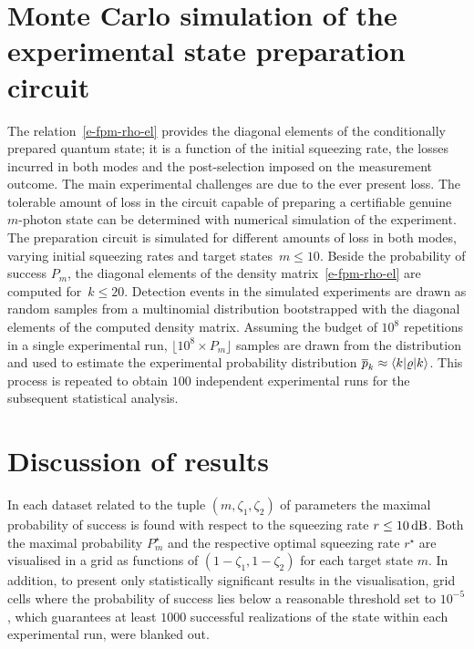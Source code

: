 \documentclass{article}
\begin{document}
%
%

\section{Monte Carlo simulation of the experimental state preparation circuit}

The relation~\eqref{e-fpm-rho-el} provides the diagonal elements of the conditionally prepared quantum state; it is a function of the initial squeezing rate, the losses incurred in both modes and the post-selection imposed on the measurement outcome. The main experimental challenges are due to the ever present loss. The tolerable amount of loss in the circuit capable of preparing a certifiable genuine $m$-photon state can be determined with numerical simulation of the experiment. The preparation circuit is simulated for different amounts of loss in both modes, varying initial squeezing rates and target states~${m \leq 10}$. Beside the probability of success $P_{m}$, the diagonal elements of the density matrix~\eqref{e-fpm-rho-el} are computed for~${k \leq 20}$. Detection events in the simulated experiments are drawn as random samples from a multinomial distribution bootstrapped with the diagonal elements of the computed density matrix. Assuming the budget of $10^{8}$ repetitions in a single experimental run, ${\lfloor 10^{8} \times P_{m} \rfloor}$ samples are drawn from the distribution and used to estimate the experimental probability distribution ${\overline{p}_{k} \approx \braket{k|\varrho|k}}$. This process is repeated to obtain $100$ independent experimental runs for the subsequent statistical analysis.

%
%

\FloatBarrier
\section{Discussion of results}

In each dataset related to the tuple $(m, \zeta_{1}, \zeta_{2})$ of parameters the maximal probability of success is found with respect to the squeezing rate ${r \leq 10\,\mathrm{dB}}$. Both the maximal probability $P_{m}^{\star}$ and the respective optimal squeezing rate ${r^{\star}}$ are visualised in a grid as functions of ${(1 - \zeta_{1}, 1 - \zeta_{2})}$ for each target state $m$. In addition, to present only statistically significant results in the visualisation, grid cells where the probability of success lies below a reasonable threshold set to $10^{-5}$, which guarantees at least $1000$ successful realizations of the state within each experimental run, were blanked out.
\end{document}
